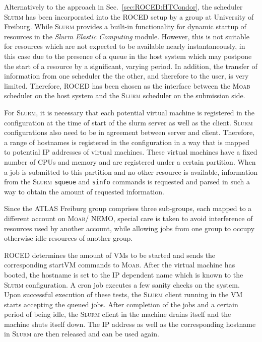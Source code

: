 Alternatively to the approach in Sec.~\ref{sec:ROCED:HTCondor}, the
scheduler \textsc{Slurm} has been incorporated into the ROCED setup by
a group at University of Freiburg.
While \textsc{Slurm} provides a built-in functionality for dynamic
startup of resources in the \textit{Slurm Elastic Computing} module\cite{SlurmElastic}. 
However, this is not suitable for resources which are not
expected to be available nearly instantaneously, in this case due to
the presence of a queue in the host system which may postpone the start
of a resource by a significant, varying period.
In addition, the transfer of information from one scheduler the the
other, and therefore to the user, is very limited.
Therefore, ROCED has been chosen as the interface between the
\textsc{Moab} scheduler on the host system and the \textsc{Slurm}
scheduler on the submission side.

For \textsc{Slurm}, it is necessary that each potential virtual
machine is registered in the configuration at the time of start of the
slurm server as well as the client. \textsc{Slurm} configurations also
need to be in agreement between server and client.
Therefore, a range of hostnames is registered in the configuration in
a way that is mapped to potential IP addresses of virtual machines.
These virtual machines have a fixed number of CPUs and memory and are
registered under a certain partition.
When a job is submitted to this partition and no other resource is
available, information from the \textsc{Slurm} \texttt{squeue} and
\texttt{sinfo} commands is requested and parsed in such a way to
obtain the amount of requested information.

Since the ATLAS Freiburg group comprises three sub-groups, each mapped
to a different account on \textsc{Moab}/ NEMO, special care is taken to
avoid interference of resources used by another account, while
allowing jobs from one group to occupy otherwise idle resources of another group.


ROCED determines the amount of VMs to be started and sends the
corresponding startVM commands to \textsc{Moab}.
After the virtual machine has booted, the hostname is set to the IP
dependent name which is known to the \textsc{Slurm} configuration.
A cron job executes a few sanity
checks on the system.
Upon successful execution of these tests, the \textsc{Slurm} client
running in the VM starts accepting the queued jobs.
After completion of the jobs and a certain period of being idle, the
\textsc{Slurm} client in the machine drains itself and the machine
shuts itself down.
The IP address as well as the corresponding hostname in \textsc{Slurm}
are then released and can be used again.




